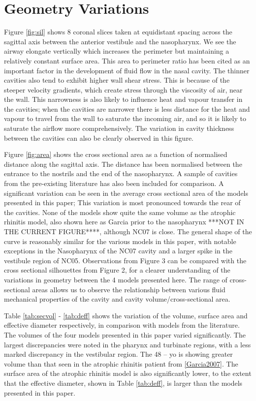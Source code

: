 \section{Geometry Variations}
Figure \ref{fig:sil} shows 8 coronal slices taken at equidistant spacing across the sagittal axis between the anterior vestibule and the nasopharynx. We see the airway elongate vertically which increases the perimeter but maintaining a relatively constant surface area. This area to perimeter ratio has been cited as an important factor in the development of fluid flow in the nasal cavity. The thinner cavities also tend to exhibit higher wall shear stress. This is because of the steeper velocity gradients, which create stress through the viscosity of air, near the wall. This narrowness is also likely to influence heat and vapour transfer in the cavities; when the cavities are narrower there is less distance for the heat and vapour to travel from the wall to saturate the incoming air, and so it is likely to saturate the airflow more comprehensively. The variation in cavity thickness between the cavities can also be clearly observed in this figure.

Figure \ref{fig:area} shows the cross sectional area as a function of normalised distance along the sagittal axis. The distance has been normalised between the entrance to the nostrils and the end of the nasopharynx. A sample of cavities from the pre-existing literature has also been included for comparison. A significant variation can be seen in the average cross sectional area of the models presented in this paper; This variation is most pronounced towards the rear of the cavities. None of the models show quite the same volume as the atrophic rhinitis model, also shown here as Garcia prior to the nasopharynx ***NOT IN THE CURRENT FIGURE****, although NC07 is close. The general shape of the curve is reasonably similar for the various models in this paper, with notable exceptions in the Nasopharynx of the NC07 cavity and a larger spike in the vestibule region of NC05. Observations from Figure 3 can be compared with the cross sectional silhouettes from Figure 2, for a clearer understanding of the variations in geometry between the 4 models presented here. The range of cross-sectional areas allows us to observe the relationship between various fluid mechanical properties of the cavity and cavity volume/cross-sectional area.

Table \ref{tab:secvol} - \ref{tab:deff} shows the variation of the volume, surface area and effective diameter respectively, in comparison with models from the literature. The volumes of the four models presented in this paper varied significantly. The largest discrepancies were noted in the pharynx and turbinate regions, with a less marked discrepancy in the vestibular region. The 48 – yo is showing greater volume than that seen in the atrophic rhinitis patient from \ref{Garcia2007}. The surface area of the atrophic rhinitis model is also significantly lower, to the extent that the effective diameter, shown in Table \ref{tab:deff}, is larger than the models presented in this paper.

